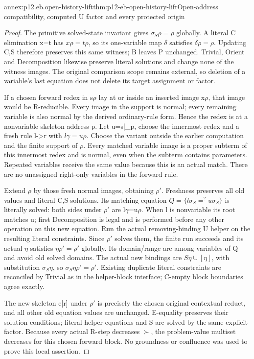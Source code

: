 \begin{annexitem}{annex:p12.eb.open-history-lift}{thm:p12-eb-open-history-lift}{Open-address compatibility, computed U factor and every protected origin}
\begin{proof}
The primitive solved-state invariant gives
\(\sigma_S\rho=\rho\) globally. A literal C elimination
x=t has \(x\rho=t\rho\), so its one-variable map
\(\delta\) satisfies \(\delta\rho=\rho\). Updating C,S
therefore preserves this same witness; B leaves P unchanged.
Trivial, Orient and Decomposition likewise preserve literal
solutions and change none of the witness images. The original
comparison scope remains external, so deletion of a variable's
last equation does not delete its target assignment or factor.

If a chosen forward redex in s\(\rho\) lay at or inside an
inserted image x\(\rho\), that image would be R-reducible.
Every image in the support is normal; every remaining variable
is also normal by the derived ordinary-rule form. Hence the
redex is at a nonvariable skeleton address p. Let u=s|_p,
choose the innermost redex and a fresh rule l->r with
\(l\gamma=u\rho\). Choose the variant outside the earlier
computation and the finite support of \(\rho\).
Every matched variable image is a proper subterm of this
innermost redex and is normal, even when the subterm contains
parameters. Repeated variables receive the same value because
this is an actual match. There are no unassigned right-only
variables in the forward rule.

Extend \(\rho\) by those fresh normal images, obtaining
\(\rho'\). Freshness preserves all old values and literal
C,S solutions. Its matching equation
\(Q=\{l\sigma_S=^{?}u\sigma_S\}\) is literally solved:
both sides under \(\rho'\) are l\(\gamma\)=u\(\rho\).
When l is nonvariable its root matches u; first Decomposition
is legal and is performed before any other operation on this
new equation. Run the actual removing-binding U helper on the
resulting literal constraints. Since \(\rho'\) solves them,
the finite run succeeds and its actual \(\eta\) satisfies
\(\eta\rho'=\rho'\) globally. Its domain/range are among
variables of Q and avoid old solved domains. The actual new
bindings are \(S\eta\cup[\eta]\), with substitution
\(\sigma_S\eta\), so
\(\sigma_S\eta\rho'=\rho'\). Existing duplicate literal
constraints are reconciled by Trivial as in the helper-block
interface; C-empty block boundaries agree exactly.

The new skeleton e[r] under \(\rho'\) is precisely the
chosen original contextual reduct, and all other old equation
values are unchanged. E-equality preserves their solution
conditions; literal helper equations and S are solved by the
same explicit factor. Because every actual R-step decreases
\(\succ\), the problem-value multiset decreases for this
chosen forward block. No groundness or confluence was used
to prove this local assertion.


\end{proof}
\end{annexitem}

